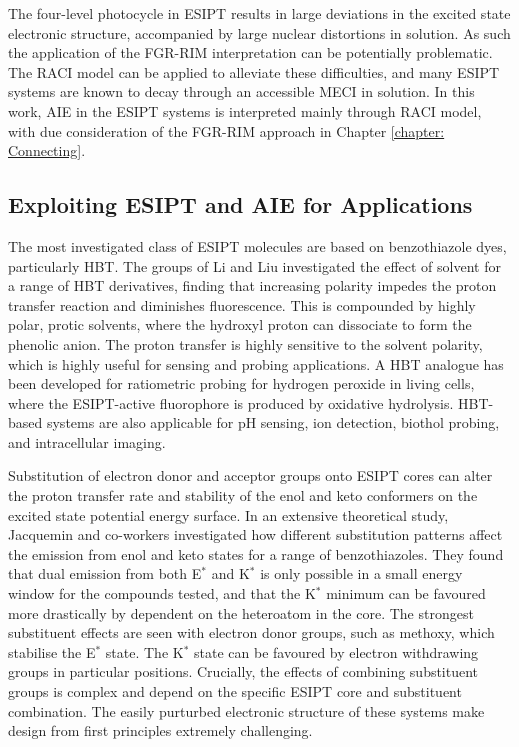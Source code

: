 The four-level photocycle in \ac{ESIPT} results in large deviations in the excited state electronic structure, accompanied by large nuclear distortions in solution. As such the application of the \ac{FGR-RIM} interpretation can be potentially problematic. The \ac{RACI} model can be applied to alleviate these difficulties, and many ESIPT systems are known to decay through an accessible \ac{MECI} in solution.\cite{Sobolewski2006,Sobolewski2006a,Barbatti2009,Park2009,Lochbrunner2001,Shigemitsu2012,Sporkel2013,Plasser2014,Baker2015,Park2017,Chen2018} In this work, AIE in the \ac{ESIPT} systems is interpreted mainly through \ac{RACI} model,  with due consideration of the \ac{FGR-RIM} approach in Chapter \ref{chapter: Connecting}.

\subsection{Exploiting ESIPT and AIE for Applications}
The most investigated class of \ac{ESIPT} molecules are based on benzothiazole dyes, particularly \ac{HBT}.\cite{Padalkar2015,Kwon2011} The groups of Li and Liu investigated the effect of solvent for a range of \ac{HBT} derivatives, finding that increasing polarity impedes the proton transfer reaction and diminishes fluorescence. This is compounded by highly polar, protic solvents, where the hydroxyl proton can dissociate to form the phenolic anion. The proton transfer is highly sensitive to the solvent polarity, which is highly useful for sensing and probing applications.\cite{Wang2009,Cheng2015f} A \ac{HBT} analogue has been developed for ratiometric probing for hydrogen peroxide in living cells, where the \ac{ESIPT}-active fluorophore is produced by oxidative hydrolysis.\cite{Tang2018a} \ac{HBT}-based systems are also applicable for pH sensing, ion detection, biothol probing, and intracellular imaging.\cite{Kachwal2018,Kachwal2018,Liu2018}

Substitution of electron donor and acceptor groups onto \ac{ESIPT} cores can alter the proton transfer rate and stability of the enol and keto conformers on the excited state potential energy surface. In an extensive theoretical study, Jacquemin and co-workers investigated how different substitution patterns affect the emission from enol and keto states for a range of benzothiazoles.\cite{Azarias2016} They found that dual emission from both E$^*$ and K$^*$ is only possible in a small energy window for the compounds tested, and that the K$^*$ minimum can be favoured more drastically by dependent on the heteroatom in the core. The strongest substituent effects are seen with electron donor groups, such as methoxy, which stabilise the E$^*$ state. The K$^*$ state can be favoured by electron withdrawing groups in particular positions. Crucially, the effects of combining substituent groups is complex and depend on the specific \ac{ESIPT} core and substituent combination. The easily purturbed electronic structure of these systems make design from first principles extremely challenging.

